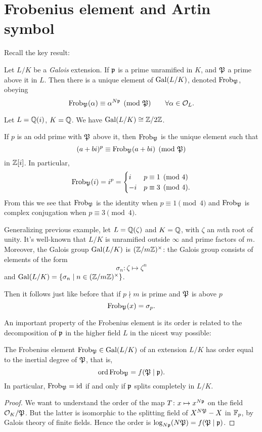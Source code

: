 \section{Frobenius element and Artin symbol}
Recall the key result:
\begin{theorem}
	Let $L/K$ be a \emph{Galois} extension.
	If $\mathfrak p$ is a prime unramified in $K$,
	and $\mathfrak P$ a prime above it in $L$.
	Then there is a unique element of $\operatorname{Gal}(L/K)$,
	denoted $\mathrm{Frob}_\mathfrak P$, obeying
	\[ \mathrm{Frob}_\mathfrak P(\alpha) \equiv \alpha^{N\mathfrak p} \pmod{\mathfrak P}
		\qquad \forall \alpha \in \mathcal O_L. \]
\end{theorem}
\begin{example}
	Let $L = \mathbb Q(i)$, $K = \mathbb Q$.
	We have $\operatorname{Gal}(L/K) \cong \mathbb Z/2\mathbb Z$.

	If $p$ is an odd prime with $\mathfrak P$ above it,
	then $\mathrm{Frob}_\mathfrak P$ is the unique element such that
	\[ (a+bi)^p \equiv \mathrm{Frob}_\mathfrak P(a+bi) \pmod{\mathfrak P} \]
	in $\mathbb Z[i]$. In particular,
	\[ \mathrm{Frob}_\mathfrak P(i) = i^p =
		\begin{cases}
			i & p \equiv 1 \pmod 4 \\
			-i & p \equiv 3 \pmod 4.
		\end{cases}
	\]
	From this we see that $\mathrm{Frob}_\mathfrak P$ is the identity when $p \equiv 1 \pmod 4$
	and $\mathrm{Frob}_\mathfrak P$ is complex conjugation when $p \equiv 3 \pmod 4$.
\end{example}
\begin{example}
	Generalizing previous example, let $L = \mathbb Q(\zeta)$ and $K = \mathbb Q$,
	with $\zeta$ an $m$th root of unity.
	It's well-known that $L/K$ is unramified outside $\infty$
	and prime factors of $m$.
	Moreover, the Galois group $\operatorname{Gal}(L/K)$ is $(\mathbb Z/m\mathbb Z)^\times$:
	the Galois group consists of elements of the form
	\[ \sigma_n \colon \zeta \mapsto \zeta^n \]
	and $\operatorname{Gal}(L/K) = \left\{ \sigma_n \mid n \in (\mathbb Z/m\mathbb Z)^\times \right\}$.

	Then it follows just like before that
	if $p \nmid m$ is prime and $\mathfrak P$ is above $p$
	\[ \mathrm{Frob}_\mathfrak P(x) = \sigma_p. \]
\end{example}

An important property of the Frobenius element is its order
is related to the decomposition of $\mathfrak p$ in the higher field $L$
in the nicest way possible:
\begin{lemma}
	The Frobenius element $\mathrm{Frob}_\mathfrak P \in \operatorname{Gal}(L/K)$
	of an extension $L/K$ has order equal to the
	inertial degree of $\mathfrak P$, that is,
	\[ \operatorname{ord} \mathrm{Frob}_\mathfrak P = f(\mathfrak P \mid \mathfrak p). \]
	In particular, $\mathrm{Frob}_\mathfrak P = \mathrm{id}$ if and only if $\mathfrak p$
	splits completely in $L/K$.
\end{lemma}
\begin{proof}
	We want to understand the order of the map $T \colon x \mapsto x^{N\mathfrak p}$ on
	the field $\mathcal O_K / \mathfrak P$.
	But the latter is isomorphic to the splitting field
	of $X^{N\mathfrak P} - X$ in $\mathbb F_p$, by Galois theory of finite fields.
	Hence the order is $\log_{N\mathfrak p} (N\mathfrak P) = f(\mathfrak P \mid \mathfrak p)$.
\end{proof}


